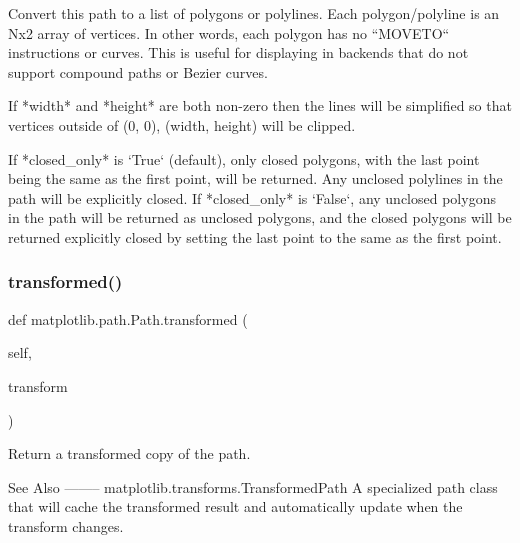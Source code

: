 \begin{DoxyVerb}Convert this path to a list of polygons or polylines.  Each
polygon/polyline is an Nx2 array of vertices.  In other words,
each polygon has no ``MOVETO`` instructions or curves.  This
is useful for displaying in backends that do not support
compound paths or Bezier curves.

If *width* and *height* are both non-zero then the lines will
be simplified so that vertices outside of (0, 0), (width,
height) will be clipped.

If *closed_only* is `True` (default), only closed polygons,
with the last point being the same as the first point, will be
returned.  Any unclosed polylines in the path will be
explicitly closed.  If *closed_only* is `False`, any unclosed
polygons in the path will be returned as unclosed polygons,
and the closed polygons will be returned explicitly closed by
setting the last point to the same as the first point.
\end{DoxyVerb}
 \mbox{\label{classmatplotlib_1_1path_1_1Path_acbbb3e1212913372ed4f428314404c92}} 
\subsubsection{\texorpdfstring{transformed()}{transformed()}}
{\footnotesize\ttfamily def matplotlib.\+path.\+Path.\+transformed (\begin{DoxyParamCaption}\item[{}]{self,  }\item[{}]{transform }\end{DoxyParamCaption})}

\begin{DoxyVerb}Return a transformed copy of the path.

See Also
--------
matplotlib.transforms.TransformedPath
    A specialized path class that will cache the transformed result and
    automatically update when the transform changes.
\end{DoxyVerb}
 \mbox{\label{classmatplotlib_1_1path_1_1Path_a8e59114bca03a98af3c350a61eb0e6fc}} 
